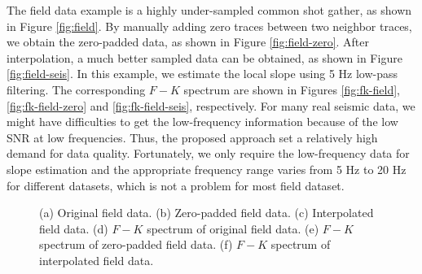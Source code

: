 The field data example is a highly under-sampled common shot gather, as shown in Figure \ref{fig:field}. By manually adding zero traces between two neighbor traces, we obtain the zero-padded data, as shown in Figure \ref{fig:field-zero}. After interpolation, a much better sampled data can be obtained, as shown in Figure \ref{fig:field-seis}. In this example, we estimate the local slope using 5 Hz low-pass filtering. The corresponding $F-K$ spectrum are shown in Figures \ref{fig:fk-field}, \ref{fig:fk-field-zero} and \ref{fig:fk-field-seis}, respectively. For many real seismic data, we might have difficulties to get the low-frequency information because of the low SNR at low frequencies. Thus, the proposed approach set a relatively high demand for data quality. Fortunately, we only require the low-frequency data for slope estimation and the appropriate frequency range varies from 5 Hz to 20 Hz for different datasets, which is not a problem for most field dataset.

\begin{figure}[htb!]
  \centering
	\caption{(a) Original field data. (b) Zero-padded field data. (c) Interpolated field data. (d) $F-K$ spectrum of original field data. (e) $F-K$ spectrum of zero-padded field data. (f) $F-K$ spectrum of interpolated field data.}
   \label{fig:field,field-zero,field-seis,fk-field,fk-field-zero,fk-field-seis}
\end{figure}


